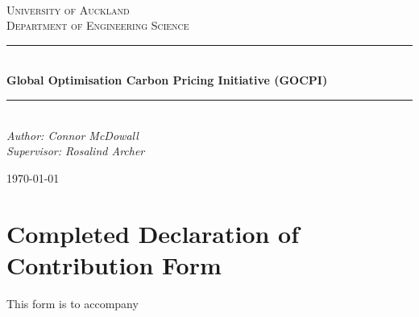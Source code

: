 \documentclass[12pt]{article}
\begin{document}
\begin{titlepage}
	\newcommand{\HRule}{\rule{\linewidth}{0.5mm}} %
	
	\center
	
	
	\textsc{\LARGE }\\[1.5cm] %
	
	\textsc{\Large University of Auckland\\Department of Engineering Science}\\[0.5cm] %
	
	
	\HRule\\[0.5cm]
	
	{\huge\bfseries Global Optimisation Carbon Pricing Initiative (GOCPI)}\\[0.4cm] %
	
	\HRule\\[0.5cm]
	
	
	{\large\textit{Author: Connor McDowall \\Supervisor: Rosalind Archer}}\\
	
	
	\vfill\vfill\vfill %
	
	{\large\today} %
	 
	
	\vfill %
	
\end{titlepage}
\newpage
\section*{Completed Declaration of Contribution Form}
This form is to accompany
\newpage
\end{document}

